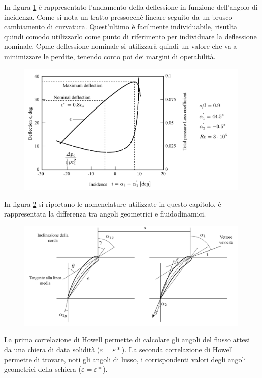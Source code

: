 In figura \ref{fig:Howell} è rappresentato l'andamento della deflessione in funzione dell'angolo di incidenza. Come si nota un tratto pressocchè lineare seguito da un brusco cambiamento di curvatura. Quest'ultimo è facilmente individuabile, risutlta quindi comodo utilizzarlo come punto di riferimento per individuare la deflessione nominale. Cpme deflessione nominale si utilizzarà quindi un valore che va a minimizzare le perdite, tenendo conto poi dei margini di operabilità.  
\begin{figure}
\centering
  \includegraphics[width=\textwidth]{fig/Howell.pdf}
\caption{}
\label{fig:Howell}
\end{figure}
In figura \ref{fig:SchieraDim} si riportano le nomenclature utilizzate in questo capitolo, è rappresentata la differenza tra angoli geometrici e fluidodinamici.
\begin{figure}
\centering
  \includegraphics[width=\textwidth]{fig/SchieraDim.pdf}
\caption{}
\label{fig:SchieraDim}
\end{figure}
La prima correlazione di Howell permette di calcolare gli angoli del flusso attesi da una chiera di data solidità ($\varepsilon = \varepsilon*$).
La seconda correlazione di Howell permette di trovare, noti gli angoli di lusso, i corrispondenti valori degli angoli geometrici della schiera ($\varepsilon = \varepsilon*$).
